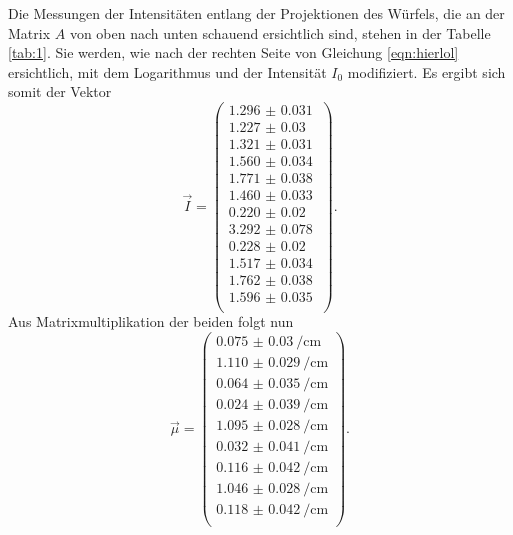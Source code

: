 Die Messungen der Intensitäten entlang der Projektionen des Würfels, die an der Matrix $A$ von oben nach unten schauend ersichtlich sind, stehen in der Tabelle \ref{tab:1}. 
Sie werden, wie nach der rechten Seite von Gleichung \eqref{eqn:hierlol} ersichtlich, mit dem Logarithmus und der Intensität $I_0$ modifiziert. Es ergibt sich somit der Vektor
\begin{equation}
\vec{I} = 
\begin{pmatrix}
    \SI{1.296(31)}{} \\ 
    \SI{1.227(30)}{} \\ 
    \SI{1.321(31)}{} \\ 
    \SI{1.560(34)}{} \\ 
    \SI{1.771(38)}{} \\ 
    \SI{1.460(33)}{} \\ 
    \SI{0.220(20)}{} \\ 
    \SI{3.292(78)}{} \\ 
    \SI{0.228(20)}{} \\ 
    \SI{1.517(34)}{} \\ 
    \SI{1.762(38)}{} \\ 
    \SI{1.596(35)}{} \\ 
\end{pmatrix}.
\end{equation}
Aus Matrixmultiplikation der beiden folgt nun 
\begin{equation}
\vec{\mu} = 
\begin{pmatrix}
    \SI{0.075(30)}{\per\centi\meter} \\ 
    \SI{1.110(29)}{\per\centi\meter} \\ 
    \SI{0.064(35)}{\per\centi\meter} \\ 
    \SI{0.024(39)}{\per\centi\meter} \\ 
    \SI{1.095(28)}{\per\centi\meter} \\ 
    \SI{0.032(41)}{\per\centi\meter} \\ 
    \SI{0.116(42)}{\per\centi\meter} \\ 
    \SI{1.046(28)}{\per\centi\meter} \\ 
    \SI{0.118(42)}{\per\centi\meter} \\ 
\end{pmatrix}.
\end{equation}
